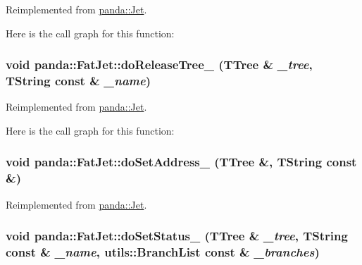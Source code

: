 Reimplemented from \hyperlink{classpanda_1_1Jet_ac8801b9ee9b645f4d0a24aa34accb414}{panda::Jet}.

Here is the call graph for this function:\hypertarget{classpanda_1_1FatJet_a8a4681a9c643494786d131103f281aa8}{
\subsubsection[{doReleaseTree\_\-}]{\setlength{\rightskip}{0pt plus 5cm}void panda::FatJet::doReleaseTree\_\- (TTree \& {\em \_\-tree}, \/  TString const \& {\em \_\-name})}}
\label{classpanda_1_1FatJet_a8a4681a9c643494786d131103f281aa8}


Reimplemented from \hyperlink{classpanda_1_1Jet_a3bc50ef589095a1bae03b1f4bbf74077}{panda::Jet}.

Here is the call graph for this function:\hypertarget{classpanda_1_1FatJet_a3f92ff4d7d7bb8f83fa43e4ef20bc036}{
\subsubsection[{doSetAddress\_\-}]{\setlength{\rightskip}{0pt plus 5cm}void panda::FatJet::doSetAddress\_\- (TTree \&, \/  TString const \&)}}
\label{classpanda_1_1FatJet_a3f92ff4d7d7bb8f83fa43e4ef20bc036}


Reimplemented from \hyperlink{classpanda_1_1Jet_a4e59030d68ca3a27fb72f0c0976bdb27}{panda::Jet}.\hypertarget{classpanda_1_1FatJet_ad63603b0bd69d4e3b6173a194b3e6829}{
\subsubsection[{doSetStatus\_\-}]{\setlength{\rightskip}{0pt plus 5cm}void panda::FatJet::doSetStatus\_\- (TTree \& {\em \_\-tree}, \/  TString const \& {\em \_\-name}, \/  {\bf utils::BranchList} const \& {\em \_\-branches})}}
\label{classpanda_1_1FatJet_ad63603b0bd69d4e3b6173a194b3e6829}


